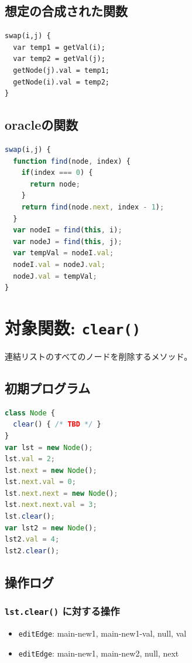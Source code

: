 \documentclass{article}
\begin{document}
\subsection{想定の合成された関数}
\begin{lstlisting}
swap(i,j) {
  var temp1 = getVal(i);
  var temp2 = getVal(j);
  getNode(j).val = temp1;
  getNode(i).val = temp2;
}
\end{lstlisting}

\subsection{oracleの関数}
\begin{lstlisting}[language=JavaScript]
swap(i,j) {
  function find(node, index) {
    if(index === 0) {
      return node;
    }
    return find(node.next, index - 1);
  }
  var nodeI = find(this, i);
  var nodeJ = find(this, j);
  var tempVal = nodeI.val;
  nodeI.val = nodeJ.val;
  nodeJ.val = tempVal;
}
\end{lstlisting}





\section{対象関数: \texttt{clear()}}
連結リストのすべてのノードを削除するメソッド。

\subsection{初期プログラム}

\begin{lstlisting}[language=JavaScript]
class Node {
  clear() { /* TBD */ }
}
var lst = new Node(); 
lst.val = 2;
lst.next = new Node();
lst.next.val = 0;
lst.next.next = new Node();
lst.next.next.val = 3;
lst.clear();
var lst2 = new Node();
lst2.val = 4;
lst2.clear();
\end{lstlisting}

\subsection{操作ログ}

\subsubsection{\texttt{lst.clear()} に対する操作}
\begin{itemize}
  \item \texttt{editEdge}: main-new1, main-new1-val, null, val
  \item \texttt{editEdge}: main-new1, main-new2, null, next
\end{itemize}
\end{document}
